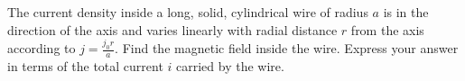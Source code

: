 \documentclass[11pt,letterpaper,boxed]{hmcpset}
\begin{document}
	\begin{solution}
		\vfill
	\end{solution}
	\newpage
	
	\begin{problem}[HRK P33.13] The current density inside a long, solid, cylindrical wire of radius $a$ is in the direction of the axis and varies linearly with radial distance $r$ from the axis according to $j = \frac{j_0 r}{a}$. Find the magnetic field inside the wire. Express your answer in terms of the total current $i$ carried by the wire.
	\end{problem}
	
	\begin{solution}
		\vfill
	\end{solution}
	\newpage
	
	
\end{document}
